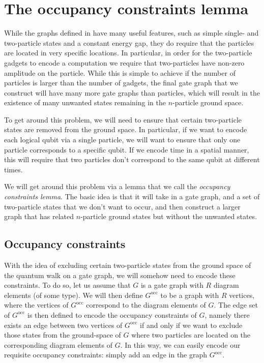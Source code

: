 \documentclass[../thesis-main/thesis-main]{subfiles}
\begin{document}
%

\section{The occupancy constraints lemma}\label{sec:occupancy_constraints_lemma}

While the graphs defined in  have many useful features, such as simple single- and two-particle states and a constant energy gap, they do require that the particles are located in very specific locations.  In particular, in order for the two-particle gadgets to encode a computation we require that two-particles have non-zero amplitude on the particle.  While this is simple to achieve if the number of particles is larger than the number of gadgets, the final gate graph that we construct will have many more gate graphs than particles, which will result in the existence of many unwanted states remaining in the $n$-particle ground space.

To get around this problem, we will need to ensure that certain two-particle states are removed from the ground space.  In particular, if we want to encode each logical qubit via a single particle, we will want to ensure that only one particle corresponds to a specific qubit.  If we encode time in a spatial manner, this will require that two particles don't correspond to the same qubit at different times.

We will get around this problem via a lemma that we call the \emph{occupancy constraints lemma}.  The basic idea is that it will take in a gate graph, and a set of two-particle states that we don't want to occur, and then construct a larger graph that has related $n$-particle ground states but without the unwanted states.

\subsection{Occupancy constraints}
\label{sec:occupancy_constraints}

With the idea of excluding certain two-particle states from the ground space of the quantum walk on a gate graph, we will somehow need to encode these constraints.  To do so, let us assume that $G$ is a gate graph with $R$ diagram elements (of some type).  We will then define $G^{\text{occ}}$ to be a graph with $R$ vertices, where the vertices of $G^{\text{occ}}$ correspond to the diagram elements of $G$.  The edge set of $G^{\text{occ}}$ is then defined to encode the occupancy constraints of $G$, namely there exists an edge between two vertices of $G^{\text{occ}}$ if and only if we want to exclude those states from the ground-space of $G$ where two particles are located on the corresponding diagram elements of $G$.  In this way, we can easily encode our requisite occupancy constraints: simply add an edge in the graph $G^{\text{occ}}$.
\end{document}
